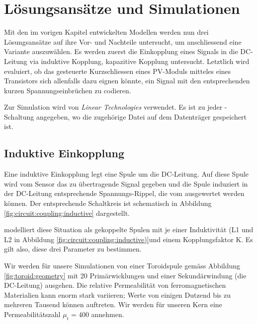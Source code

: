 \chapter{L\"osungsans\"atze und Simulationen}
\label{chap:simu}

Mit   den  im   vorigen  Kapitel   entwickelten  Modellen   werden  nun   drei
L\"osungsans\"atze auf  ihre Vor-  und Nachteile untersucht,  um anschliessend
eine   Variante  auszuw\"ahlen. Es   werden  zuerst   die  Einkopplung   eines
Signals  in  die  DC-Leitung   via  induktive  Kopplung,  kapazitive  Kopplung
untersucht. Letztlich wird  evaluiert, ob das gesteuerte  Kurzschliessen eines
PV-Moduls mitteles eines Transistors sich allenfalls dazu eignen k\"onnte, ein
Signal mit den entsprechenden kurzen Spannungseinbr\"uchen zu codieren.

Zur  Simulation wird    \cite{ref:ltspice} von  \emph{Linear
Technologies} verwendet. Es  ist zu jeder  -Schaltung angegeben,
wo die zugeh\"orige Datei auf dem Datentr\"ager gespeichert ist.

\section{Induktive Einkopplung}
\label{sec:simu:coupling:inductive}

Eine induktive Einkopplung legt eine  Spule um die DC-Leitung. Auf diese Spule
wird vom Sensor  das zu \"ubertragende Signal gegeben und  die Spule induziert
in der DC-Leitung entsprechende  Spannungs-Rippel, die vom \Master ausgewertet
werden k\"onnen. Der  entsprechende Schaltkreis  ist schematisch  in Abbildung
\ref{fig:circuit:coupling:inductive} dargestellt.

    modelliert   diese    Situation   als    gekoppelte   Spulen
mit    je     einer    Induktivit\"at     (L1    und    L2     in    Abbildung
\ref{fig:circuit:coupling:inductive)}und  einem   Kopplungsfaktor  K. Es  gilt
also, diese drei Parameter zu bestimmen.

Wir  werden   f\"ur  unsere   Simulationen  von  einer   Toroidspule  gem\"ass
Abbildung  \ref{fig:toroid:geometry}  mit   20  Prim\"arwicklungen  und  einer
Sekund\"arwindung (die DC-Leitung) ausgehen.  Die relative Permeabilit\"at von
ferromagnetischen Materialien  kann enorm  stark variieren; Werte  von einigen
Dutzend bis zu  mehreren Tausend k\"onnen auftreten. Wir  werden f\"ur unseren
Kern eine Permeabilit\"atszahl $\mu_{\mathrm{r}} = 400$ annehmen.

